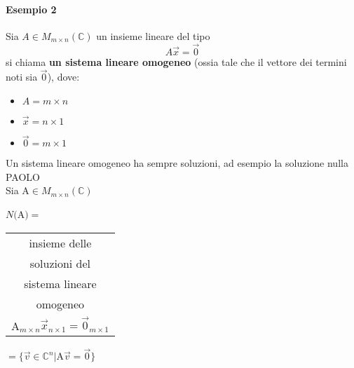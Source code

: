 \paragraph{Esempio 2} Sia $A\in M_{m\times n}(\mathbb{C})$ un insieme lineare
del tipo 
$$A\vec{x}=\vec{0}$$
si chiama \textbf{un sistema lineare omogeneo}
(ossia tale che il vettore dei termini noti sia $\vec{0}$), dove: 
\begin{itemize}
    \item $A= m\times n$
    \item $\vec{x} = n\times 1$
    \item $\vec{0} = m\times 1$
\end{itemize}

Un sistema lineare omogeneo ha sempre soluzioni, ad esempio la soluzione
nulla
\\{\color{purple}PAOLO}\\

Sia A$\in M_{m\times n}(\mathbb{C})$

\begin{center}
    $N($A$)=$
    \begin{tabular}{c}
        insieme delle\\
        soluzioni del \\
        sistema lineare\\
        omogeneo\\
        A$_{m\times n}\vec{x}_{n\times 1}=\vec{0}_{m\times 1}$
    \end{tabular}
    $=\{\vec{v}\in\mathbb{C}^n|$A$\vec{v}=\vec{0}\}$
\end{center}

